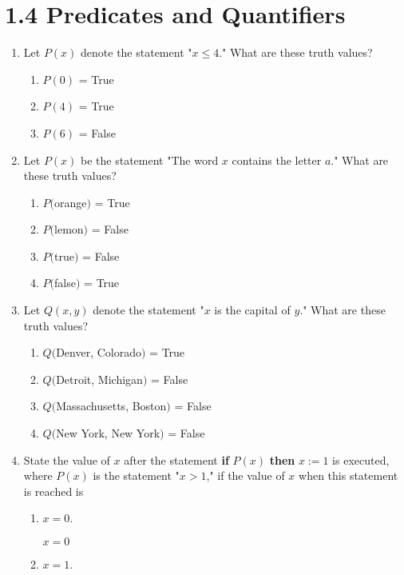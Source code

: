 \documentclass[11pt]{article}
\begin{document}
\section*{\textbf{1.4 Predicates and Quantifiers}}
\begin{enumerate}[label=\textbf{\arabic*.}]
	\item Let $P(x)$ denote the statement "$x \le 4$." What are these truth values?
	\begin{enumerate}[label=\textbf{\alph*)}]
		\item $P(0)$ = True		
		\item $P(4)$ = True
		\item $P(6)$ = False
	\end{enumerate}

	\item Let $P(x)$ be the statement "The word $x$ contains the letter $a$." What are these truth values?
	\begin{enumerate}[label=\textbf{\alph*)}]
		\item $P($orange$)$ = True
		\item $P($lemon$)$ = False
		\item $P($true$)$ = False
		\item $P($false$)$ = True
	\end{enumerate}

	\item Let $Q(x,y)$ denote the statement "$x$ is the capital of $y$." What are these truth values?
	\begin{enumerate}[label=\textbf{\alph*)}]
		\item $Q($Denver, Colorado$)$ = True
		\item $Q($Detroit, Michigan$)$ = False
		\item $Q($Massachusetts, Boston$)$ = False
		\item $Q($New York, New York$)$ = False
	\end{enumerate}

	\item State the value of $x$ after the statement \textbf{if} $P(x)$ \textbf{then} $x := 1$ is executed, where $P(x)$ is the statement "$x > 1$," if the value of $x$ when this statement is reached is
	\begin{enumerate}[label=\textbf{\alph*)}]
		\item $x = 0$.
		
		$x = 0$
		
		\item $x = 1$.
		

\end{enumerate}
\end{enumerate}
\end{document}
